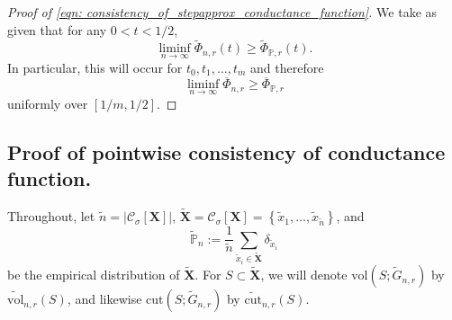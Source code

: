 \documentclass{article}
\newcommand{\set}[1]{\left\{#1\right\}}
\newcommand{\vol}{\mathrm{vol}}
\newcommand{\abs}[1]{\left \lvert #1 \right \rvert}
\newcommand{\1}{\mathbf{1}}
\newcommand{\cut}{\mathrm{cut}}
\newcommand{\Xbf}{\mathbf{X}}
\newcommand{\Pbb}{\mathbb{P}}
\newcommand{\Cset}{\mathcal{C}}
\newcommand{\Csig}{\Cset_{\sigma}}
\newcommand{\wn}{\widetilde{n}}
\newcommand{\wX}{\widetilde{\Xbf}}
\newcommand{\wx}{\widetilde{x}}
\theoremstyle{aldenthm}
\begin{document}
\begin{proof}[Proof of \eqref{eqn: consistency_of_stepapprox_conductance_function}]
	We take as given that for any $0 < t < 1/2$,
	\begin{equation*}
	\liminf_{n \to \infty} \widetilde{\Phi}_{n,r}(t) \geq \widetilde{\Phi}_{\Pbb,r}(t).
	\end{equation*}
	In particular, this will occur for $t_0, t_1, \ldots, t_m$ and therefore
	\begin{equation*}
	\liminf_{n \to \infty} \overline{\Phi}_{n,r} \geq \overline{\Phi}_{\Pbb,r}
	\end{equation*}
	uniformly over $[1/m,1/2]$.
\end{proof}

\subsection{Proof of pointwise consistency of conductance function.}
\label{subsection: proof_of_pointwise consitency_of_conductance_function}

Throughout, let $\wn = \abs{\Csig[\Xbf]}$, $\wX = \Csig[\Xbf] = \set{\wx_1, \ldots, \wx_{\wn}}$, and 
\begin{equation*}
\widetilde{\Pbb}_n := \frac{1}{\wn} \sum_{\wx_i \in \wX} \delta_{\wx_i}
\end{equation*}
be the empirical distribution of $\wX$. For $S \subset \wX$, we will denote $\vol(S; \widetilde{G}_{n,r})$ by $\widetilde{\vol}_{n,r}(S)$, and likewise $\cut(S; \widetilde{G}_{n,r})$ by $\widetilde{\cut}_{n,r}(S)$.
\end{document}
